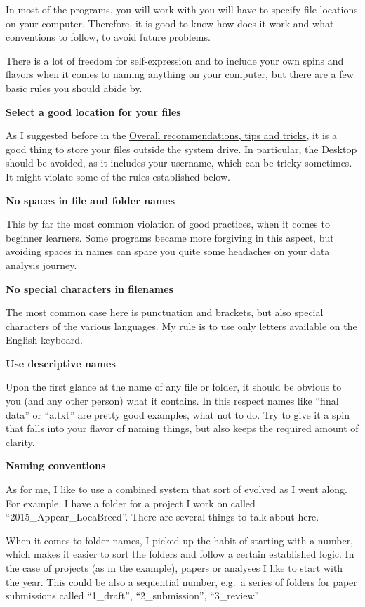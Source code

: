 \documentclass[]{book}
\begin{document}
In most of the programs, you will work with you will have to specify
file locations on your computer. Therefore, it is good to know how does
it work and what conventions to follow, to avoid future problems.

There is a lot of freedom for self-expression and to include your own
spins and flavors when it comes to naming anything on your computer, but
there are a few basic rules you should abide by.

\textbf{Select a good location for your files}

As I suggested before in the
\protect\hyperlink{overall-recommendations-tips-and-tricks}{Overall
recommendations, tips and tricks}, it is a good thing to store your
files outside the system drive. In particular, the Desktop should be
avoided, as it includes your username, which can be tricky sometimes. It
might violate some of the rules established below.

\textbf{No spaces in file and folder names}

This by far the most common violation of good practices, when it comes
to beginner learners. Some programs became more forgiving in this
aspect, but avoiding spaces in names can spare you quite some headaches
on your data analysis journey.

\textbf{No special characters in filenames}

The most common case here is punctuation and brackets, but also special
characters of the various languages. My rule is to use only letters
available on the English keyboard.

\textbf{Use descriptive names}

Upon the first glance at the name of any file or folder, it should be
obvious to you (and any other person) what it contains. In this respect
names like ``final data'' or ``a.txt'' are pretty good examples, what
not to do. Try to give it a spin that falls into your flavor of naming
things, but also keeps the required amount of clarity.

\textbf{Naming conventions}

As for me, I like to use a combined system that sort of evolved as I
went along. For example, I have a folder for a project I work on called
``2015\_Appear\_LocaBreed''. There are several things to talk about
here.

When it comes to folder names, I picked up the habit of starting with a
number, which makes it easier to sort the folders and follow a certain
established logic. In the case of projects (as in the example), papers
or analyses I like to start with the year. This could be also a
sequential number, e.g.~a series of folders for paper submissions called
``1\_draft'', ``2\_submission'', ``3\_review''
\end{document}
